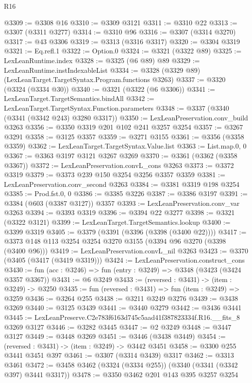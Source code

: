 \begin{lexlean}{R16}
\begin{coremodule}
@3309 := @3308 @16
@3310 := @3309 @3121
@3311 := @3310 @22
@3313 := @3307 (@3311 @3277)
@3314 := @3310 @96
@3316 := @3307 (@3314 @3270)
@3317 := @43 @3306
@3319 := @3313 (@3316 @3317)
@3320 := @3304 @3319
@3321 := Eq.refl.{1}
@3322 := Option.{0}
@3324 := @3321 (@3322 @89)
@3325 := LexLeanRuntime.index
@3328 := @3325 (@6 @89) @89
@3329 := LexLeanRuntime.instIndexableList
@3334 := @3328 (@3329 @89) (LexLeanTarget.TargetSyntax.Program.functions @3263)
@3337 := @3320 (@3324 (@3334 @30))
@3340 := @3321 (@3322 (@6 @3306))
@3341 := LexLeanTarget.TargetSemantics.bindAll
@3342 := LexLeanTarget.TargetSyntax.Function.parameters
@3348 := @3337 (@3340 (@3341 (@3342 @243) @3280 @3317))
@3350 := LexLeanPreservation.conv_build @3263
@3356 := @3350 @3319 @201 @102 @241 @3257 @3254
@3357 := @3267 @3291
@3358 := @3125 @3357
@3359 := @3271 @3155
@3361 := @3356 (@3358 @3359)
@3362 := LexLeanTarget.TargetSyntax.Value.list
@3363 := List.map.{0, 0}
@3367 := @3363 @3197 @3121 @3267 @3269
@3370 := @3361 (@3362 (@3358 @3367))
@3372 := LexLeanPreservation.convL_cons @3263
@3373 := @3372 @3319
@3379 := @3373 @239 @150 @3254 @3256 @3357 @3359
@3381 := LexLeanPreservation.conv_second @3263
@3384 := @3381 @3319 @198 @3254
@3385 := Prod.fst.{0, 0}
@3386 := @3385 @3226
@3387 := @3386 @3197
@3391 := @3384 (@603 (@3387 @3127)) @3357
@3393 := LexLeanPreservation.conv_var @3263
@3394 := @3393 @3319
@3396 := @3394 @22 @3277
@3398 := @3321 (@3322 @3121)
@3399 := LexLeanTarget.TargetSemantics.lookup
@3400 := @3399 @3319
@3405 := @3379 (@3391 (@3396 (@3398 (@3400 @22))))
@3417 := @3373 @148 @113 @3254 @3254 @3270 @3155 (@3394 @96 @3270 (@3398 (@3400 @96)))
@3419 := LexLeanPreservation.convL_nil @3263
@3423 := @3370 (@3405 (@3417 (@3419 @3319)))
@3424 := LexLeanPreservation.construct_cons
@3430 := fun (acc : @3246) => fun (entry : @3249) => @3348 (@3423 (@3424 @3357 @3367))
@3431 := @6 @3249
@3433 := (reversed : @3431) -> (item : @3249) -> @3250
@3435 := fun (reversed : @3431) => fun (item : @3249) => @3259
@3436 := @3264 @255
@3438 := @3211 @3249 @3276
@3439 := @3438 @3269
@3440 := @3125 @3439
@3441 := @3440 @3279
@3442 := @3436 @3441
@3445 := LexLeanPreserve.C2e783f6163d745c5aad41f387823334f.R16.__fits_8 @3269 @3127
@3446 := @3282 @3445
@3447 := @2 @3249
@3448 := @3447 @3127
@3449 := @3448 @3269
@3451 := @3446 (@3438 @3449)
@3454 := (reversed : @3431) -> (item : @3249) -> @3442 @3451
@3458 := @3300 @255 @3441 @3451 @397
@3461 := @3307 (@3314 @3439) @3317
@3462 := @3313 @3461
@3472 := @3458 @3462 (@3324 (@3334 @255)) (@3340 (@3341 (@3342 @397) @3441 @3317))
@3478 := @3350 @3462 @201 @143 @395 @3257 @3254

\end{coremodule}
\end{lexlean}
